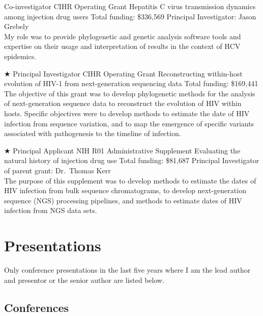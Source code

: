 \documentclass[11pt]{moderncv}
\begin{document}
{Co-investigator}
{CIHR Operating Grant}
{Hepatitis C virus transmission dynamics among injection drug users}
{Total funding: \$336,569}
{
Principal Investigator: Jason Grebely\\
My role was to provide phylogenetic and genetic analysis software tools and expertise on their usage and interpretation of results in the context of HCV epidemics.\\
}

{$\bigstar$ Principal Investigator}
{CIHR Operating Grant}
{Reconstructing within-host evolution of HIV-1 from next-generation sequencing data}
{Total funding: \$169,441}
{
The objective of this grant was to develop phylogenetic methods for the analysis of next-generation sequence data to reconstruct the evolution of HIV within hosts.
Specific objectives were to develop methods to estimate the date of HIV infection from sequence variation, and to map the emergence of specific variants associated with pathogenesis to the timeline of infection.\\
}


{$\bigstar$ Principal Applicant}
{NIH R01 Administrative Supplement}
{Evaluating the natural history of injection drug use}
{Total funding: \$81,687}
{
Principal Investigator of parent grant: Dr.~Thomas Kerr\\
The purpose of this supplement was to develop methods to estimate the dates of HIV infection from bulk sequence chromatograms, to develop next-generation sequence (NGS) processing pipelines, and methods to estimate dates of HIV infection from NGS data sets.\\
}






\section {Presentations}

Only conference presentations in the last five years where I am the lead author and presentor or the senior author are listed below.

\subsection {Conferences}


\end{document}
